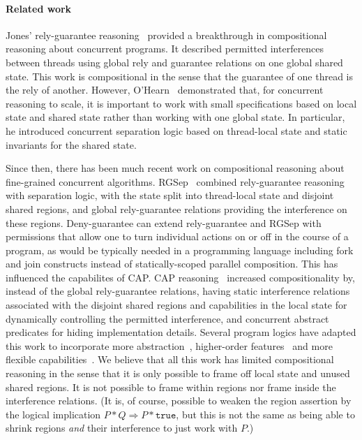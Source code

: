 \paragraph{Related work}
Jones' rely-guarantee reasoning~\cite{rg} provided a breakthrough in
compositional reasoning about concurrent programs. It described
permitted interferences between threads using global rely and
guarantee relations on one  global shared state. This work is
compositional in the sense that the guarantee of one thread is the
rely of another. However, O'Hearn~\cite{csl-tcs} demonstrated that,
for  concurrent reasoning to scale,
 it is important to work with small specifications
based on local  state and shared state rather than working with one
global state. In particular, he introduced concurrent
separation logic based on thread-local state and static invariants for
the shared state.

Since then, there has been much recent work on compositional
reasoning about fine-grained concurrent algorithms. RGSep~\cite{viktor-marriage} combined rely-guarantee reasoning with
separation logic, with the state split into thread-local state and
disjoint shared regions, and global rely-guarantee relations providing
the interference on these regions.
Deny-guarantee can extend rely-guarantee and
RGSep with permissions that allow one to turn
individual actions on or off in the course of a program, as would be
typically needed in a programming language including fork and join
constructs instead of statically-scoped parallel composition. This has
influenced the capabilites of CAP.
CAP reasoning~\cite{cap-ecoop10} increased  compositionality by, instead of the
global
rely-guarantee relations, having static interference relations
associated with the disjoint shared regions and capabilities in the local
state for dynamically controlling the permitted  interference, and concurrent
abstract predicates for hiding implementation details. Several
program logics have adapted this work to incorporate more
abstraction~\cite{caresl}, higher-order features~\cite{icap} and more flexible
capabilities~\cite{tada}. We believe that all  this work has  limited compositional
reasoning in the sense that it is only possible to frame off local
state and unused shared regions. It is not possible to 
frame within regions nor frame inside the interference
relations.  (It is, of course, possible to weaken the region assertion
by the logical implication $P * Q \Rightarrow P * \texttt{true}$, but this is
not the same as being able to shrink regions \emph{and} their interference to
just work with $P$.) 

